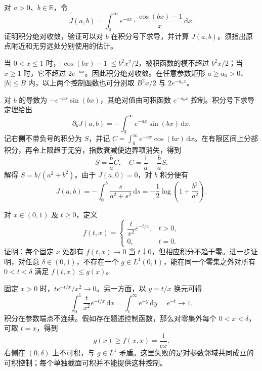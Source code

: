 \begin{exercise}\label{b2:ex:01-damped-cosine}
对 \(a>0\)、\(b\in\mathbb R\)，令
\[
 J(a,b)=\int_0^\infty e^{-ax}\cdot\dfrac{\cos(bx)-1}{x}\,\mathrm dx.
\]
证明积分绝对收敛，验证可以对 \(b\) 在积分号下求导，并计算 \(J(a,b)\)。须指出原点附近和无穷远处分别使用的估计。
\end{exercise}
\begin{solution}
当 \(0<x\leq1\) 时，\(|\cos(bx)-1|\leq b^2x^2/2\)，被积函数的模不超过 \(b^2x/2\)；当 \(x\geq1\) 时，它不超过 \(2e^{-ax}\)。因此积分绝对收敛。在任意参数矩形 \(a\geq a_0>0\)、\(|b|\leq B\) 内，以上两个控制函数也可分别取 \(B^2x/2\) 与 \(2e^{-a_0x}\)。

对 \(b\) 的导数为 \(-e^{-ax}\sin(bx)\)，其绝对值由可积函数 \(e^{-a_0x}\) 控制。积分号下求导定理给出
\[
 \partial_bJ(a,b)=-\int_0^\infty e^{-ax}\sin(bx)\,\mathrm dx.
\]
记右侧不带负号的积分为 \(S\)，并记 \(C=\int_0^\infty e^{-ax}\cos(bx)\,\mathrm dx\)。在有限区间上分部积分，再令上限趋于无穷，指数衰减使边界项消失，得到
\[
 S=\dfrac ba C,\quad C=\dfrac1a-\dfrac ba S.
\]
解得 \(S=b/(a^2+b^2)\)。由于 \(J(a,0)=0\)，对 \(b\) 积分便有
\[
 J(a,b)=-\int_0^b\dfrac{s}{a^2+s^2}\,\mathrm ds
 =-\dfrac12\log\left(1+\dfrac{b^2}{a^2}\right).
\]
\end{solution}

\begin{exercise}\label{b2:ex:01-concentration-at-endpoint}
对 \(x\in(0,1)\) 及 \(t\geq0\)，定义
\[
 f(t,x)=
 \begin{cases}
 \dfrac{t}{x^2}e^{-t/x},&t>0,\\
 0,&t=0.
 \end{cases}
\]
证明：每个固定 \(x\) 处都有 \(f(t,x)\to0\) 当 \(t\downarrow0\)，但相应积分不趋于零。进一步证明，对任意 \(\delta\in(0,1)\)，不存在一个 \(g\in L^1(0,1)\)，能在同一个零集之外对所有 \(0<t<\delta\) 满足 \(f(t,x)\leq g(x)\)。
\end{exercise}
\begin{solution}
固定 \(x>0\) 时，\(t e^{-t/x}/x^2\to0\)。另一方面，以 \(y=t/x\) 换元可得
\[
 \int_0^1\dfrac{t}{x^2}e^{-t/x}\,\mathrm dx
 =\int_t^\infty e^{-y}\,\mathrm dy=e^{-t}\longrightarrow1.
\]
积分在参数端点不连续。假如存在题述控制函数，那么对零集外每个 \(0<x<\delta\)，可取 \(t=x\)，得到
\[
 g(x)\geq f(x,x)=\dfrac{1}{ex}.
\]
右侧在 \((0,\delta)\) 上不可积，与 \(g\in L^1\) 矛盾。这里失败的是对参数邻域共同成立的可积控制；每个单独截面可积并不能提供这种控制。
\end{solution}

